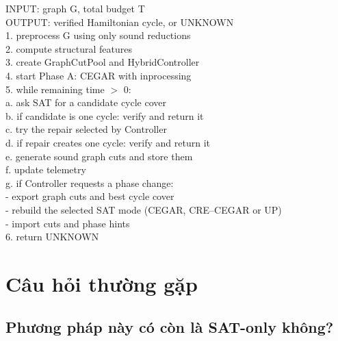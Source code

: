 \documentclass[11pt,a4paper,oneside]{scrreprt}
\begin{document}
\begin{tcolorbox}[breakable,colback=paper,colframe=navy,title={\sffamily\bfseries Thuật toán AHS-HCP},fontupper=\ttfamily\small]
INPUT: graph G, total budget T\\
OUTPUT: verified Hamiltonian cycle, or UNKNOWN\\[1mm]

1. preprocess G using only sound reductions\\
2. compute structural features\\
3. create GraphCutPool and HybridController\\
4. start Phase A: CEGAR with inprocessing\\
5. while remaining time $>$ 0:\\
\hspace*{5mm}a. ask SAT for a candidate cycle cover\\
\hspace*{5mm}b. if candidate is one cycle: verify and return it\\
\hspace*{5mm}c. try the repair selected by Controller\\
\hspace*{5mm}d. if repair creates one cycle: verify and return it\\
\hspace*{5mm}e. generate sound graph cuts and store them\\
\hspace*{5mm}f. update telemetry\\
\hspace*{5mm}g. if Controller requests a phase change:\\
\hspace*{10mm}- export graph cuts and best cycle cover\\
\hspace*{10mm}- rebuild the selected SAT mode (CEGAR, CRE--CEGAR or UP)\\
\hspace*{10mm}- import cuts and phase hints\\
6. return UNKNOWN
\end{tcolorbox}

\chapter{Câu hỏi thường gặp}

\section*{Phương pháp này có còn là SAT-only không?}
\end{document}
